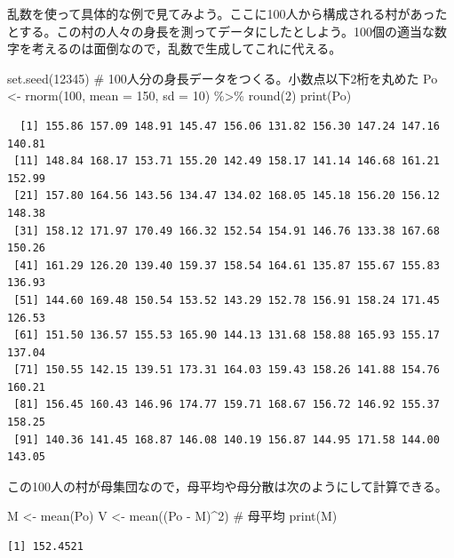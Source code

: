 \documentclass[
  a4paper,
]{ltjsbook}
\newenvironment{Shaded}{\begin{snugshade}}{\end{snugshade}}
\newcommand{\AttributeTok}[1]{\textcolor[rgb]{0.40,0.45,0.13}{#1}}
\newcommand{\CommentTok}[1]{\textcolor[rgb]{0.37,0.37,0.37}{#1}}
\newcommand{\DecValTok}[1]{\textcolor[rgb]{0.68,0.00,0.00}{#1}}
\newcommand{\FunctionTok}[1]{\textcolor[rgb]{0.28,0.35,0.67}{#1}}
\newcommand{\NormalTok}[1]{\textcolor[rgb]{0.00,0.23,0.31}{#1}}
\newcommand{\OtherTok}[1]{\textcolor[rgb]{0.00,0.23,0.31}{#1}}
\newcommand{\SpecialCharTok}[1]{\textcolor[rgb]{0.37,0.37,0.37}{#1}}
\begin{document}
乱数を使って具体的な例で見てみよう。ここに100人から構成される村があったとする。この村の人々の身長を測ってデータにしたとしよう。100個の適当な数字を考えるのは面倒なので，乱数で生成してこれに代える。

\begin{Shaded}
\begin{Highlighting}[]
\FunctionTok{set.seed}\NormalTok{(}\DecValTok{12345}\NormalTok{)}
\CommentTok{\# 100人分の身長データをつくる。小数点以下2桁を丸めた}
\NormalTok{Po }\OtherTok{\textless{}{-}} \FunctionTok{rnorm}\NormalTok{(}\DecValTok{100}\NormalTok{, }\AttributeTok{mean =} \DecValTok{150}\NormalTok{, }\AttributeTok{sd =} \DecValTok{10}\NormalTok{) }\SpecialCharTok{\%\textgreater{}\%} \FunctionTok{round}\NormalTok{(}\DecValTok{2}\NormalTok{)}
\FunctionTok{print}\NormalTok{(Po)}
\end{Highlighting}
\end{Shaded}

\begin{verbatim}
  [1] 155.86 157.09 148.91 145.47 156.06 131.82 156.30 147.24 147.16 140.81
 [11] 148.84 168.17 153.71 155.20 142.49 158.17 141.14 146.68 161.21 152.99
 [21] 157.80 164.56 143.56 134.47 134.02 168.05 145.18 156.20 156.12 148.38
 [31] 158.12 171.97 170.49 166.32 152.54 154.91 146.76 133.38 167.68 150.26
 [41] 161.29 126.20 139.40 159.37 158.54 164.61 135.87 155.67 155.83 136.93
 [51] 144.60 169.48 150.54 153.52 143.29 152.78 156.91 158.24 171.45 126.53
 [61] 151.50 136.57 155.53 165.90 144.13 131.68 158.88 165.93 155.17 137.04
 [71] 150.55 142.15 139.51 173.31 164.03 159.43 158.26 141.88 154.76 160.21
 [81] 156.45 160.43 146.96 174.77 159.71 168.67 156.72 146.92 155.37 158.25
 [91] 140.36 141.45 168.87 146.08 140.19 156.87 144.95 171.58 144.00 143.05
\end{verbatim}

この100人の村が母集団なので，母平均や母分散は次のようにして計算できる。

\begin{Shaded}
\begin{Highlighting}[]
\NormalTok{M }\OtherTok{\textless{}{-}} \FunctionTok{mean}\NormalTok{(Po)}
\NormalTok{V }\OtherTok{\textless{}{-}} \FunctionTok{mean}\NormalTok{((Po }\SpecialCharTok{{-}}\NormalTok{ M)}\SpecialCharTok{\^{}}\DecValTok{2}\NormalTok{)}
\CommentTok{\# 母平均}
\FunctionTok{print}\NormalTok{(M)}
\end{Highlighting}
\end{Shaded}

\begin{verbatim}
[1] 152.4521
\end{verbatim}
\end{document}
